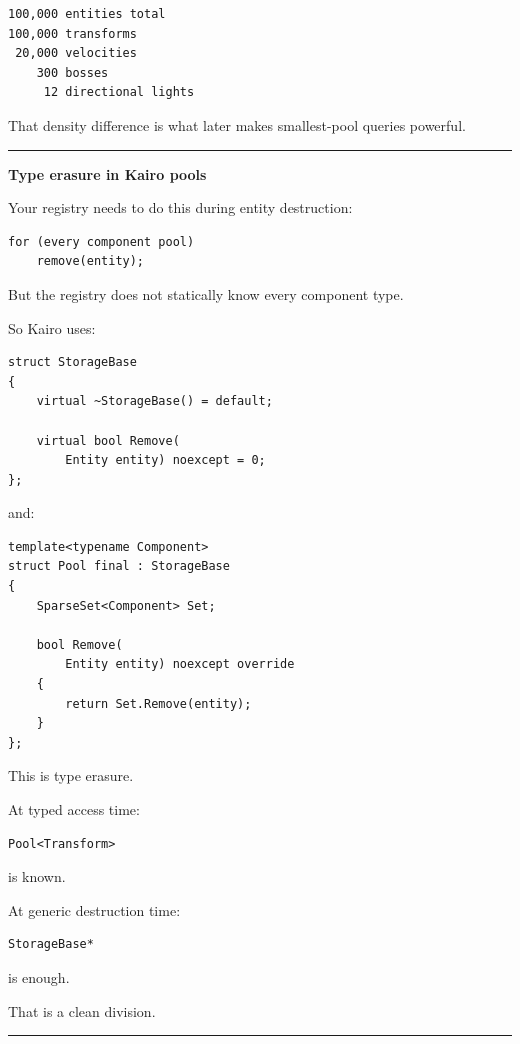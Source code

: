\begin{verbatim}
100,000 entities total
100,000 transforms
 20,000 velocities
    300 bosses
     12 directional lights
\end{verbatim}

That density difference is what later makes smallest-pool queries powerful.

\begin{center}\rule{0.5\linewidth}{0.5pt}\end{center}

\textbf{Type erasure in Kairo pools}

Your registry needs to do this during entity destruction:

\begin{verbatim}
for (every component pool)
    remove(entity);
\end{verbatim}

But the registry does not statically know every component type.

So Kairo uses:

\begin{verbatim}
struct StorageBase
{
    virtual ~StorageBase() = default;

    virtual bool Remove(
        Entity entity) noexcept = 0;
};
\end{verbatim}

and:

\begin{verbatim}
template<typename Component>
struct Pool final : StorageBase
{
    SparseSet<Component> Set;

    bool Remove(
        Entity entity) noexcept override
    {
        return Set.Remove(entity);
    }
};
\end{verbatim}

This is type erasure.

At typed access time:

\begin{verbatim}
Pool<Transform>
\end{verbatim}

is known.

At generic destruction time:

\begin{verbatim}
StorageBase*
\end{verbatim}

is enough.

That is a clean division.

\begin{center}\rule{0.5\linewidth}{0.5pt}\end{center}

